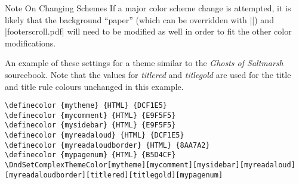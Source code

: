 \documentclass[letterpaper,twocolumn,openany,nodeprecatedcode]{dndbook}
\begin{document}
\begin{DndComment}{Note On Changing Schemes}
If a major color scheme change is attempted, it is
likely that the background ``paper'' (which can be overridden with
|\SetPaperImage|) and |footerscroll.pdf| will need
to be modified as well in order to fit the other color modifications.
\end{DndComment}

An example of these settings for a theme similar to the \textit{Ghosts of Saltmarsh} sourcebook. Note that the values for \textit{titlered} and \textit{titlegold} are used for the title and title rule colours unchanged in this example.

\begin{lstlisting}[basicstyle=\ttfamily\small]
\definecolor {mytheme} {HTML} {DCF1E5}
\definecolor {mycomment} {HTML} {E9F5F5}
\definecolor {mysidebar} {HTML} {E9F5F5}
\definecolor {myreadaloud} {HTML} {DCF1E5}
\definecolor {myreadaloudborder} {HTML} {8AA7A2}
\definecolor {mypagenum} {HTML} {B5D4CF}
\DndSetComplexThemeColor[mytheme][mycomment][mysidebar][myreadaloud][myreadaloudborder][titlered][titlegold][mypagenum]
\end{lstlisting}
\end{document}
